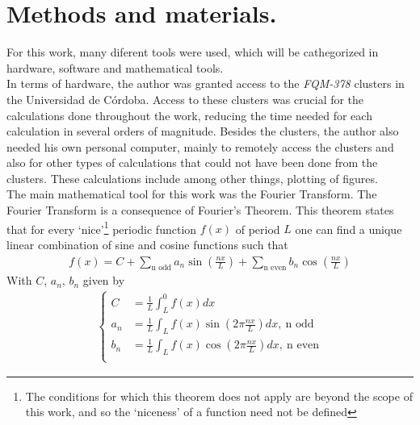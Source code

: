 \chapter{Methods and materials.}

For this work, many diferent tools were used, which will be cathegorized in hardware, software and mathematical tools. \\

In terms of hardware, the author was granted access to the \textit{FQM-378} clusters in the Universidad de Córdoba. Access to these clusters was crucial for the calculations done throughout the work, reducing the time needed for each calculation in several orders of magnitude. Besides the clusters, the author also needed his own personal computer, mainly to remotely access the clusters and also for other types of calculations that could not have been done from the clusters. These calculations include among other things, plotting of figures.  \\

The main mathematical tool for this work was the Fourier Transform. The Fourier Transform is a consequence of Fourier's Theorem. This theorem states that for every `nice'\footnote{The conditions for which this theorem does not apply are beyond the scope of this work, and so the `niceness' of a function need not be defined} periodic function $f(x)$ of period $L$ one can find a unique linear combination of sine and cosine functions such that 
\begin{align}
	f(x) = C + \sum_\text{n odd} a_n \sin\left( \frac{nx}{L} \right) + \sum_{\text{n even}}^{} b_n \cos \left( \frac{nx}{L} \right) 
\end{align}
With $C $, $a_n$, $b_n$ given by 
\begin{align}
	\begin{cases}
		C &= \frac{1}{L} \int_{L}^{0} f(x) dx\\
		a_n &= \frac{1}{L} \int_{L}^{} f(x) \sin\left(  2\pi \frac{nx}{L} \right) dx,~\text{n odd}\\
		b_n &= \frac{1}{L} \int_{L}^{} f(x) \cos\left(  2\pi \frac{nx}{L} \right) dx,~\text{n even}\\
	\end{cases}
\end{align}

